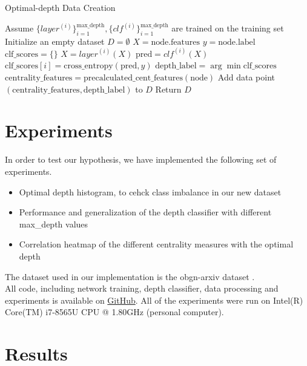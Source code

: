\documentclass[11pt,a4paper]{article}
\begin{document}
	\begin{algorithm*}
	\caption{Optimal-depth Data Creation}
	\label{alg:OptimalDepth}
	\begin{algorithmic}[1]
		\State Assume $\{layer^{(i)}\}_{i=1}^{\text{max\_depth}}, \{clf^{(i)}\}_{i=1}^{\text{max\_depth}}$ are trained on the training set
		\State Initialize an empty dataset $D = \emptyset$
		\State $X = \text{node.features}$
		\State $y = \text{node.label}$
		\State $\text{clf\_scores} = \{\}$
		\State $X = layer^{(i)}(X)$
		\State $\text{pred} = clf^{(i)}(X)$
		\State $\text{clf\_scores}[i] = \text{cross\_entropy}(\text{pred}, y)$
		\EndFor
		\State $\text{depth\_label} = \arg \min \text{clf\_scores}$
		\State $\text{centrality\_features} = \text{precalculated\_cent\_features}(\text{node})$
		\State Add data point $(\text{centrality\_features}, \text{depth\_label})$ to $D$
		\EndFor
		\State Return $D$
	\end{algorithmic} 
\end{algorithm*}


\section{Experiments}
\label{sec:Experiments}
	In order to test our hypothesis, we have implemented the following set of experiments.
	\begin{itemize}
		\item Optimal depth histogram, to cehck class imbalance in our new dataset
		\item Performance and generalization of the depth classifier with different max\_depth values
		\item Correlation heatmap of the different centrality measures with the optimal depth
	\end{itemize}
	The dataset used in our implementation is the obgn-arxiv dataset \citep{hu2020open}.\\
	All code, including network training, depth classifier, data processing and experiments is available on \href{https://github.com/Rotem-BZ/GeometricDL_project}{GitHub}. All of the experiments were run on Intel(R) Core(TM) i7-8565U CPU @ 1.80GHz (personal computer).
	
\section{Results}
\label{sec:Results}
\end{document}
